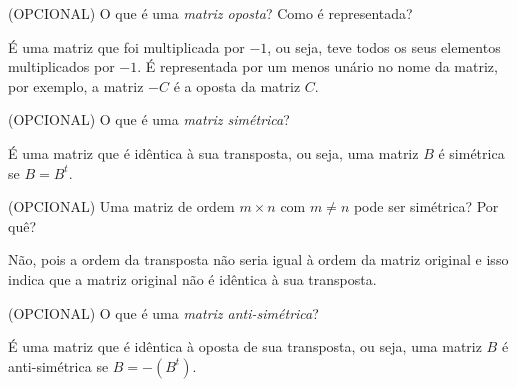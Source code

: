 \documentclass[pdftex, brazil, 12pt, oneside, addpoints]{exam}
\newcommand{\vf}[1][{}]{%
  \fillin[#1][0.25in]%
}
\begin{document}
\begin{questions}

\question
(OPCIONAL) O que é uma \emph{matriz oposta}? Como é representada?
\begin{solution}
  É uma matriz que foi multiplicada por $-1$, ou seja, teve todos os seus
  elementos multiplicados por $-1$. É representada por um menos unário no
  nome da matriz, por exemplo, a matriz $-C$ é a oposta da matriz $C$.
\end{solution}

\question
(OPCIONAL) O que é uma \emph{matriz simétrica}?
\begin{solution}
  É uma matriz que é idêntica à sua transposta, ou seja, uma matriz $B$
  é simétrica se $B = B^t$.
\end{solution}

\question
(OPCIONAL) Uma matriz de ordem $m \times n$ com $m \ne n$ pode ser simétrica? Por quê?
\begin{solution}
  Não, pois a ordem da transposta não seria igual à ordem da matriz original e
  isso indica que a matriz original não é idêntica à sua transposta.
\end{solution}

\question
(OPCIONAL) O que é uma \emph{matriz anti-simétrica}?
\begin{solution}
  É uma matriz que é idêntica à oposta de sua transposta, ou seja, uma matriz $B$
  é anti-simétrica se $B = -(B^t)$.
\end{solution}


\end{questions}
\end{document}
